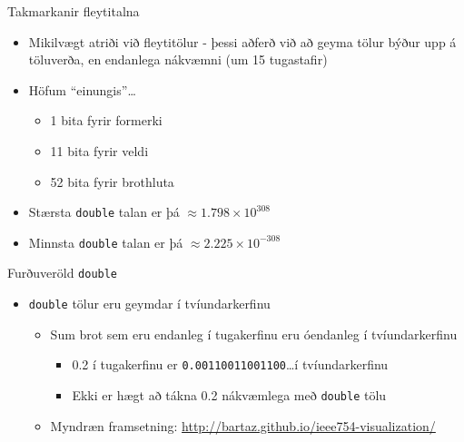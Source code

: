 \documentclass{beamer}
\begin{document}
\begin{frame}{Takmarkanir fleytitalna}
\begin{itemize}
 \item Mikilvægt atriði við fleytitölur - þessi aðferð við að geyma tölur býður upp á töluverða, en endanlega nákvæmni (um 15 tugastafir)
 \item Höfum ``einungis''\ldots
 \begin{itemize}
  \item 1 bita fyrir formerki
  \item 11 bita fyrir veldi
  \item 52 bita fyrir brothluta
 \end{itemize}
 \item Stærsta \texttt{double} talan er þá $\approx 1.798 \times 10^{308}$
 \item Minnsta \texttt{double} talan er þá $\approx 2.225 \times 10^{-308}$
\end{itemize}
\end{frame}

\begin{frame}{Furðuveröld \texttt{double}}
\begin{itemize}
 \item \texttt{double} tölur eru geymdar í tvíundarkerfinu
 \begin{itemize}
  \item Sum brot sem eru endanleg í tugakerfinu eru óendanleg í tvíundarkerfinu
  \begin{itemize}
   \item 0.2 í tugakerfinu er \texttt{0.00110011001100}\ldots í tvíundarkerfinu
   \item Ekki er hægt að tákna 0.2 nákvæmlega með \texttt{double} tölu
  \end{itemize}
  \item Myndræn framsetning: \url{http://bartaz.github.io/ieee754-visualization/}
 \end{itemize}
\end{itemize}
\end{frame}
\end{document}
